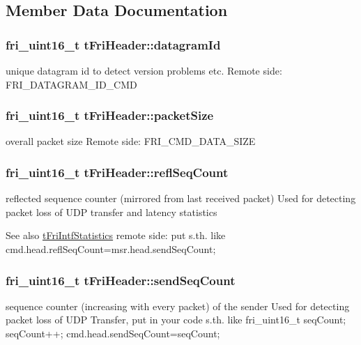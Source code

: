 \subsection{\-Member \-Data \-Documentation}
\hypertarget{structtFriHeader_a153933e518d1ce6c8ae70cde7a936938}{
\subsubsection[{datagram\-Id}]{\setlength{\rightskip}{0pt plus 5cm}fri\-\_\-uint16\-\_\-t {\bf t\-Fri\-Header\-::datagram\-Id}}}\label{structtFriHeader_a153933e518d1ce6c8ae70cde7a936938}
unique datagram id to detect version problems etc. \-Remote side\-: \-F\-R\-I\-\_\-\-D\-A\-T\-A\-G\-R\-A\-M\-\_\-\-I\-D\-\_\-\-C\-M\-D \hypertarget{structtFriHeader_acb8028f4bd6d620707e8f8cda3ebe3f9}{
\subsubsection[{packet\-Size}]{\setlength{\rightskip}{0pt plus 5cm}fri\-\_\-uint16\-\_\-t {\bf t\-Fri\-Header\-::packet\-Size}}}\label{structtFriHeader_acb8028f4bd6d620707e8f8cda3ebe3f9}
overall packet size \-Remote side\-: \-F\-R\-I\-\_\-\-C\-M\-D\-\_\-\-D\-A\-T\-A\-\_\-\-S\-I\-Z\-E \hypertarget{structtFriHeader_acc7e2afb407587e0f02776cdf53d8ab7}{
\subsubsection[{refl\-Seq\-Count}]{\setlength{\rightskip}{0pt plus 5cm}fri\-\_\-uint16\-\_\-t {\bf t\-Fri\-Header\-::refl\-Seq\-Count}}}\label{structtFriHeader_acc7e2afb407587e0f02776cdf53d8ab7}
reflected sequence counter (mirrored from last received packet) \-Used for detecting packet loss of \-U\-D\-P transfer and latency statistics \begin{DoxySeeAlso}{\-See also}
\hyperlink{structtFriIntfStatistics}{t\-Fri\-Intf\-Statistics} remote side\-: put s.\-th. like cmd.\-head.\-refl\-Seq\-Count=msr.\-head.\-send\-Seq\-Count; 
\end{DoxySeeAlso}
\hypertarget{structtFriHeader_a37b742fa9c012d740ffdbd54fa49e094}{
\subsubsection[{send\-Seq\-Count}]{\setlength{\rightskip}{0pt plus 5cm}fri\-\_\-uint16\-\_\-t {\bf t\-Fri\-Header\-::send\-Seq\-Count}}}\label{structtFriHeader_a37b742fa9c012d740ffdbd54fa49e094}
sequence counter (increasing with every packet) of the sender \-Used for detecting packet loss of \-U\-D\-P \-Transfer, put in your code s.\-th. like fri\-\_\-uint16\-\_\-t seq\-Count; seq\-Count++; cmd.\-head.\-send\-Seq\-Count=seq\-Count; 

